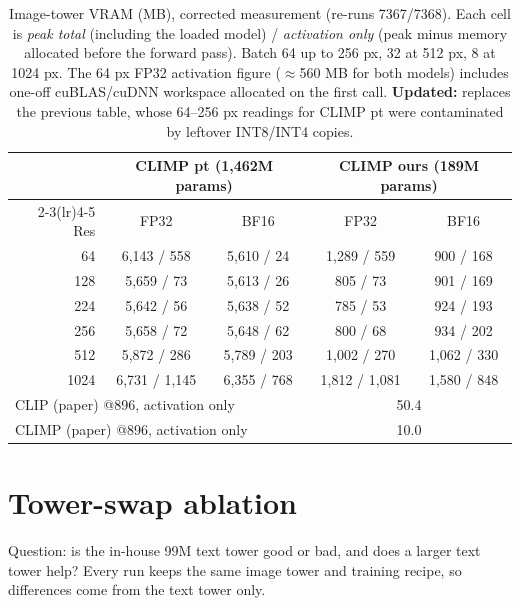 \documentclass[a4paper,10pt]{article}
\begin{document}
\begin{table}[!htbp]
\centering
\caption{Image-tower VRAM (MB), corrected measurement (re-runs 7367/7368). Each cell is \emph{peak total} (including the loaded model) / \emph{activation only} (peak minus memory allocated before the forward pass). Batch 64 up to 256 px, 32 at 512 px, 8 at 1024 px. The 64 px FP32 activation figure ($\approx$560 MB for both models) includes one-off cuBLAS/cuDNN workspace allocated on the first call. \textbf{Updated:} replaces the previous table, whose 64--256 px readings for CLIMP pt were contaminated by leftover INT8/INT4 copies.}
\label{tab:vram}
\begin{tabular}{rcccc}
\toprule
 & \multicolumn{2}{c}{CLIMP pt (1,462M params)} & \multicolumn{2}{c}{CLIMP ours (189M params)} \\
\cmidrule(lr){2-3}\cmidrule(lr){4-5}
Res & FP32 & BF16 & FP32 & BF16 \\
\midrule
64   & 6,143 / 558   & 5,610 / 24  & 1,289 / 559   & 900 / 168   \\
128  & 5,659 / 73    & 5,613 / 26  & 805 / 73      & 901 / 169   \\
224  & 5,642 / 56    & 5,638 / 52  & 785 / 53      & 924 / 193   \\
256  & 5,658 / 72    & 5,648 / 62  & 800 / 68      & 934 / 202   \\
512  & 5,872 / 286   & 5,789 / 203 & 1,002 / 270   & 1,062 / 330 \\
1024 & 6,731 / 1,145 & 6,355 / 768 & 1,812 / 1,081 & 1,580 / 848 \\
\midrule
\multicolumn{3}{l}{CLIP (paper) @896, activation only}  & \multicolumn{2}{c}{50.4} \\
\multicolumn{3}{l}{CLIMP (paper) @896, activation only} & \multicolumn{2}{c}{10.0} \\
\bottomrule
\end{tabular}
\end{table}

\clearpage
\section{Tower-swap ablation}
Question: is the in-house 99M text tower good or bad, and does a larger text tower help?
Every run keeps the same image tower and training recipe, so differences come from the text tower only.
\end{document}
